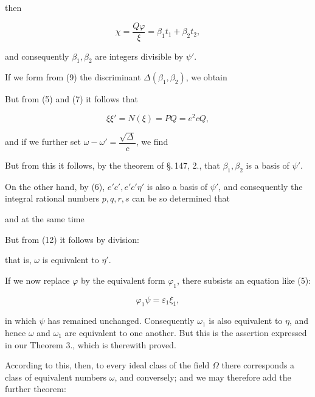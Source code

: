 
then

\[ \chi = \frac{Q\varphi}{\xi} = \beta_1t_1+\beta_2t_2, \]

and consequently $\beta_1,\beta_2$ are integers divisible by $\psi'$.

If we form from (9) the discriminant $\varDelta(\beta_1,\beta_2)$, we obtain


But from (5) and (7) it follows that

\[ \xi\xi' = N(\xi) = PQ = e^2cQ, \]

and if we further set $\omega-\omega' = \dfrac{\sqrt{\varDelta}}{c}$, we find


But from this it follows, by the theorem of \S.\,147, 2., that $\beta_1,\beta_2$ is a basis of $\psi'$.

On the other hand, by (6), $e'c', e'c'\eta'$ is also a basis of $\psi'$, and consequently the integral rational numbers $p,q,r,s$ can be so determined that


and at the same time


But from (12) it follows by division:


that is, $\omega$ is equivalent to $\eta'$.

If we now replace $\varphi$ by the equivalent form $\varphi_1$, there subsists an equation like (5):

\[ \varphi_1\psi = \varepsilon_1\xi_1, \]

in which $\psi$ has remained unchanged. Consequently $\omega_1$ is also equivalent to $\eta$, and hence $\omega$ and $\omega_1$ are equivalent to one another. %
But this is the assertion expressed in our Theorem 3., which is therewith proved.

According to this, then, to every ideal class of the field $\Omega$ there corresponds a class of equivalent numbers $\omega$, and conversely; and we may therefore add the further theorem:
